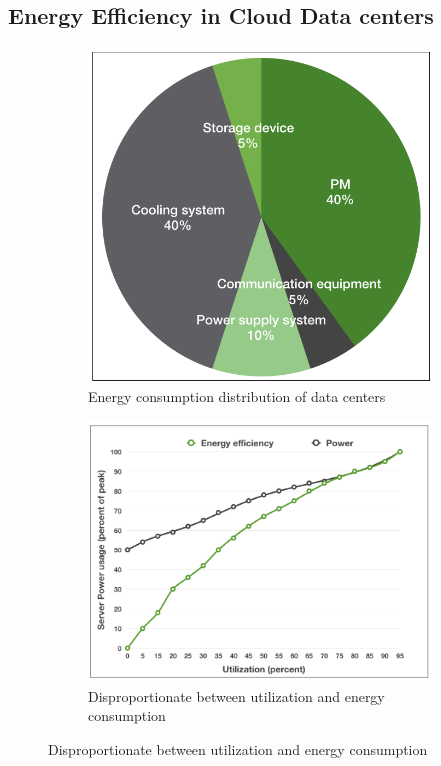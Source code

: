 \subsection{Energy Efficiency in Cloud Data centers}

\begin{figure}
	\centering
	\begin{subfigure}[b]{0.45\textwidth}
		\includegraphics[width=\textwidth]{pics/energyConsumption.png}
		\caption{Energy consumption distribution of data centers \cite{Rong:2016js}}
		\label{fig:consumption}
	\end{subfigure}
	\begin{subfigure}[b]{0.45\textwidth}
		\includegraphics[width=\textwidth]{pics/util.png}
		\caption{Disproportionate between utilization and energy consumption \cite{Barroso:2007jt}}
		\label{fig:unproportional}
	\end{subfigure}
\end{figure} 

